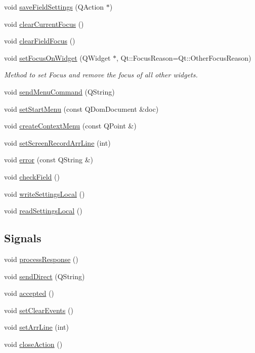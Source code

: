 \begin{DoxyCompactItemize}
\item 
void \hyperlink{classFglForm_a3d7ccbba13b950e970333db68755d022}{saveFieldSettings} (QAction $\ast$)
\item 
void \hyperlink{classFglForm_a4430f1038e2dcfd957c1d361d0c286d4}{clearCurrentFocus} ()
\item 
void \hyperlink{classFglForm_ae2815f84a3c114c000f97cc0cf431bb7}{clearFieldFocus} ()
\item 
void \hyperlink{classFglForm_abacf589f219bcfbcf54ca2a5fb9ba859}{setFocusOnWidget} (QWidget $\ast$, Qt::FocusReason=Qt::OtherFocusReason)
\begin{DoxyCompactList}\small\item\em Method to set Focus and remove the focus of all other widgets. \item\end{DoxyCompactList}\item 
void \hyperlink{classFglForm_a5e7fe57471d1f3ad4d6dbf7ac1c8b843}{sendMenuCommand} (QString)
\item 
void \hyperlink{classFglForm_af3d272e5dc101746b728bdd457d42a6f}{setStartMenu} (const QDomDocument \&doc)
\item 
void \hyperlink{classFglForm_af07f7257121ab71b9a53ccb2fd1a9fe3}{createContextMenu} (const QPoint \&)
\item 
void \hyperlink{classFglForm_afce8d989187c85d7bde751824a9b6c6a}{setScreenRecordArrLine} (int)
\item 
void \hyperlink{classFglForm_a3d2c6f2a3a0e1828ff1f43d4d93fa775}{error} (const QString \&)
\item 
void \hyperlink{classFglForm_a95fd29ee66dc40bb56d6bb94593feddd}{checkField} ()
\item 
void \hyperlink{classFglForm_a4fdd15cf1295a7d04b378e5c4cb2d877}{writeSettingsLocal} ()
\item 
void \hyperlink{classFglForm_ae9f393760ac910dd86de0919be07f41c}{readSettingsLocal} ()
\end{DoxyCompactItemize}
\subsection*{Signals}
\begin{DoxyCompactItemize}
\item 
void \hyperlink{classFglForm_a797f5a3e960a73a6fff9a1bb74059956}{processResponse} ()
\item 
void \hyperlink{classFglForm_ab8e58a4d027770ba170972d247b617dd}{sendDirect} (QString)
\item 
void \hyperlink{classFglForm_a1e972cdb1514dcb3c6613d123beb8f6a}{accepted} ()
\item 
void \hyperlink{classFglForm_a9c7de4f0bd6f44e3103df2e81a504974}{setClearEvents} ()
\item 
void \hyperlink{classFglForm_a7bef8f5a9e151e3b09d9de652b78ec92}{setArrLine} (int)
\item 
void \hyperlink{classFglForm_a6084470ee7bb46645d64a82503c60fba}{closeAction} ()
\end{DoxyCompactItemize}
